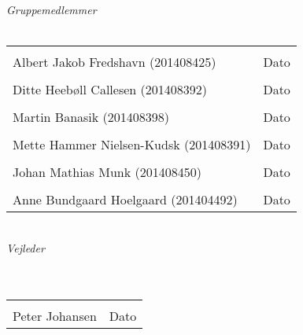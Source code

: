 \begin{vplace}[0.6]
{\large \textit{Gruppemedlemmer}}
\\
\\

\noindent \begin{tabular}{ll}
	\makebox[3.0in]{\hrulefill} & \makebox[1.5in]{\hrulefill}\\
	Albert Jakob Fredshavn  (201408425) & Dato\\[7ex]%
	\makebox[3in]{\hrulefill} & \makebox[1.5in]{\hrulefill}\\
	Ditte Heebøll Callesen  (201408392) & Dato\\[7ex]
	\makebox[3in]{\hrulefill} & \makebox[1.5in]{\hrulefill}\\
	Martin Banasik  (201408398) & Dato\\[7ex]
	\makebox[3in]{\hrulefill} & \makebox[1.5in]{\hrulefill}\\
	Mette Hammer Nielsen-Kudsk  (201408391) & Dato\\[7ex]
	\makebox[3in]{\hrulefill} & \makebox[1.5in]{\hrulefill}\\
	Johan Mathias Munk  (201408450) & Dato\\[7ex]
	\makebox[3in]{\hrulefill} & \makebox[1.5in]{\hrulefill}\\
	Anne Bundgaard Hoelgaard (201404492) & Dato\\[7ex]
	
	
\end{tabular}
\\
{\large \textit{Vejleder}}
\\
\\
\\
\noindent \begin{tabular}{ll}
	\makebox[3.0in]{\hrulefill} & \makebox[1.5in]{\hrulefill}\\
	Peter Johansen & Dato\\[8ex]
\end{tabular}
\end{vplace}
